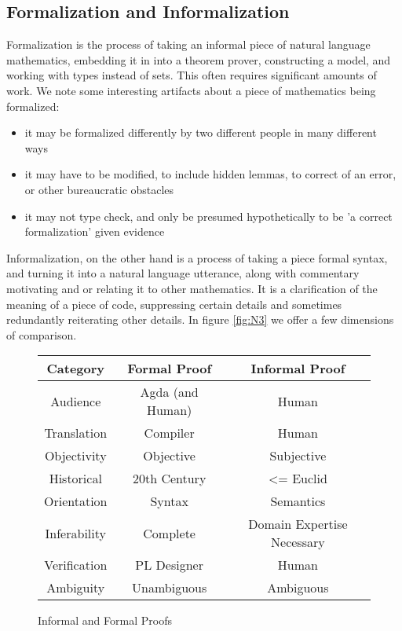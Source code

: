 \subsection{Formalization and Informalization}

Formalization is the process of taking an informal piece of natural language
mathematics, embedding it in into a theorem prover, constructing a model,
and working with types instead of sets. This often requires significant amounts of
work. We note some interesting artifacts about a piece of mathematics
being formalized:

\begin{itemize}

\item it may be formalized differently by two different people in many different ways
\item it may have to be modified, to include hidden lemmas, to correct of an
  error, or other bureaucratic obstacles
\item it may not type check, and only be presumed hypothetically to be 'a
  correct formalization' given evidence 

\end{itemize}

Informalization, on the other hand is a process of taking a piece formal syntax, and turning it into a natural
language utterance, along with commentary motivating and or relating it to other
mathematics. It is a clarification of the meaning of a piece of
code, suppressing certain details and sometimes
redundantly reiterating other details. In figure \autoref{fig:N3} we offer a few
dimensions of comparison.

\begin{figure}
\centering
\begin{tabular}{|c|c|c|} \hline
  Category & Formal Proof & Informal Proof \\ \hline
  Audience & Agda (and Human) & Human \\ \hline
  Translation & Compiler & Human \\ \hline
  Objectivity & Objective & Subjective \\ \hline %
  Historical & 20th Century & <= Euclid \\ \hline
  Orientation & Syntax & Semantics \\ \hline
  Inferability & Complete & Domain Expertise Necessary \\ \hline
  Verification & PL Designer & Human \\ \hline
  Ambiguity & Unambiguous & Ambiguous \\ \hline

\end{tabular}
\caption{Informal and Formal Proofs} \label{fig:N3}
\end{figure}

